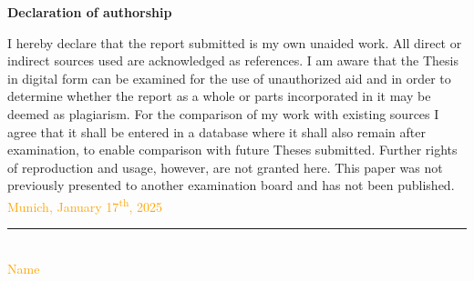 \documentclass[12pt]{article}
\begin{document}
	\RaggedRight
	
	
	\newpage
	
	
	\Large
	\noindent
	\textbf{Declaration of authorship} 
	\vspace{0.5cm}
	\noindent
	\normalsize
	
	I hereby declare that the report submitted is my own unaided work. All direct 
	or indirect sources used are acknowledged as references. I am aware that the 
	Thesis in digital form can be examined for the use of unauthorized aid and in 
	order to determine whether the report as a whole or parts incorporated in it may 
	be deemed as plagiarism. For the comparison of my work with existing sources I 
	agree that it shall be entered in a database where it shall also remain after 
	examination, to enable comparison with future Theses submitted. Further rights 
	of reproduction and usage, however, are not granted here. This paper was not 
	previously presented to another examination board and has not been published.
	\\
	
	\vspace{1cm}
	\textcolor{orange}{Munich, January 17\textsuperscript{th}, 2025 } \\
	
	\vspace{3cm}
	
	\noindent\rule{0.5\textwidth}{0.4pt} \\
	
	\textcolor{orange}{Name}
	
	
\end{document}
